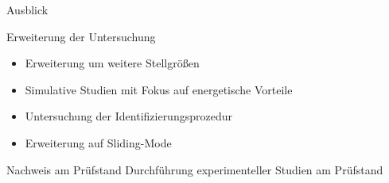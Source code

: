 \documentclass[fleqn,11pt,aspectratio=43]{beamer}
\begin{document}
\begin{frame}{Ausblick}
\begin{exampleblock}{Erweiterung der Untersuchung}
\begin{itemize}
	\item Erweiterung um weitere Stellgrößen
	\item Simulative Studien mit Fokus auf energetische Vorteile
	\item Untersuchung der Identifizierungsprozedur
	\item Erweiterung auf Sliding-Mode
\end{itemize}
\end{exampleblock}
\begin{alertblock}{Nachweis am Prüfstand}
Durchführung experimenteller Studien am Prüfstand
\end{alertblock}
\end{frame}
\end{document}
